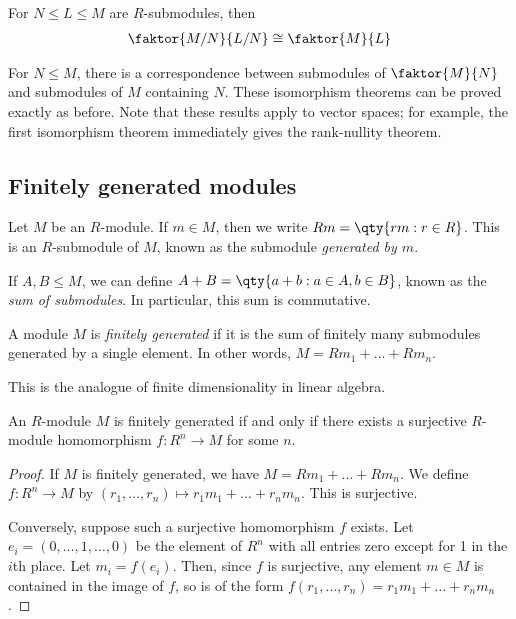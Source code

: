 \begin{theorem}
	For $N \leq L \leq M$ are $R$-submodules, then
	\begin{align*}
		\faktor{M/N}{L/N} \cong \faktor{M}{L}
	\end{align*}
\end{theorem}
For $N \leq M$, there is a correspondence between submodules of $\faktor{M}{N}$ and submodules of $M$ containing $N$.
These isomorphism theorems can be proved exactly as before.
Note that these results apply to vector spaces; for example, the first isomorphism theorem immediately gives the rank-nullity theorem.

\subsection{Finitely generated modules}
\begin{definition}
	Let $M$ be an $R$-module.
	If $m \in M$, then we write $Rm = \qty{rm : r \in R}$.
	This is an $R$-submodule of $M$, known as the submodule \textit{generated by $m$}.

	If $A, B \leq M$, we can define $A + B = \qty{a + b : a \in A, b \in B}$, known as the \textit{sum of submodules}.
	In particular, this sum is commutative.
\end{definition}
\begin{definition}
	A module $M$ is \textit{finitely generated} if it is the sum of finitely many submodules generated by a single element.
	In other words, $M = Rm_1 + \dots + Rm_n$.
\end{definition}
This is the analogue of finite dimensionality in linear algebra.
\begin{lemma}
	An $R$-module $M$ is finitely generated if and only if there exists a surjective $R$-module homomorphism $f : R^n \to M$ for some $n$.
\end{lemma}
\begin{proof}
	If $M$ is finitely generated, we have $M = Rm_1 + \dots + Rm_n$.
	We define $f : R^n \to M$ by $(r_1, \dots, r_n) \mapsto r_1 m_1 + \dots + r_n m_n$.
	This is surjective.

	Conversely, suppose such a surjective homomorphism $f$ exists.
	Let $e_i = (0, \dots, 1, \dots, 0)$ be the element of $R^n$ with all entries zero except for 1 in the $i$th place.
	Let $m_i = f(e_i)$.
	Then, since $f$ is surjective, any element $m \in M$ is contained in the image of $f$, so is of the form $f(r_1, \dots, r_n) = r_1 m_1 + \dots + r_n m_n$.
\end{proof}
